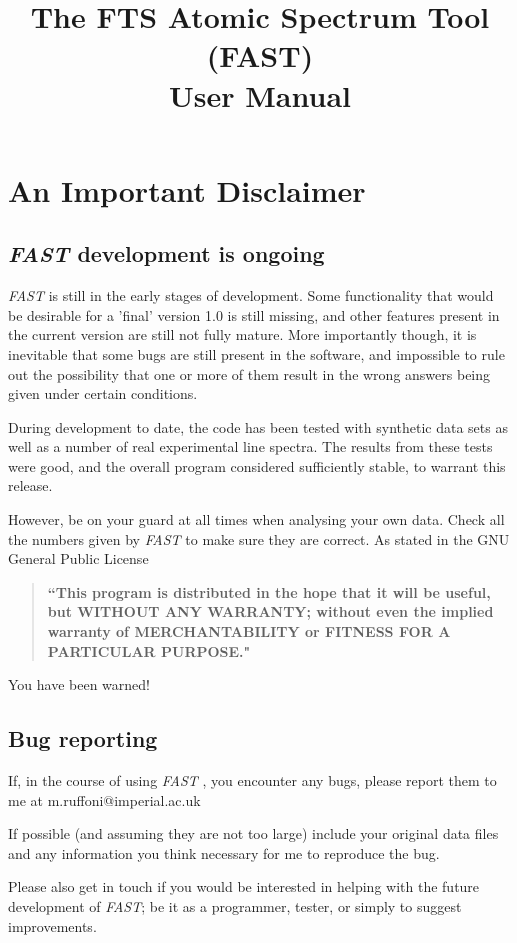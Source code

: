 \documentclass[a4paper,12pt]{report}
\title{The FTS Atomic Spectrum Tool (FAST) \\ User Manual}
\newcommand{\fast}{\emph{FAST} }
\begin{document}
\maketitle 
\tableofcontents
\chapter{An Important Disclaimer}
\section{\fast development is ongoing}
\fast is still in the early stages of development. Some functionality that would be desirable for a 'final' version 1.0 is still missing, and other features present in the current version are still not fully mature. More importantly though, it is inevitable that some bugs are still present in the software, and impossible to rule out the possibility that one or more of them result in the wrong answers being given under certain conditions.

During development to date, the code has been tested with synthetic data sets as well as a number of real experimental line spectra. The results from these tests were good, and the overall program considered sufficiently stable, to warrant this release.

However, be on your guard at all times when analysing your own data. Check all the numbers given by \fast to make sure they are correct. As stated in the GNU General Public License
\begin{quote}
{\bf``This program is distributed in the hope that it will be useful,
but WITHOUT ANY WARRANTY; without even the implied warranty of
MERCHANTABILITY or FITNESS FOR A PARTICULAR PURPOSE."}
\end{quote}
You have been warned!

\section{Bug reporting}
If, in the course of using \fast, you encounter any bugs, please report them to me at m.ruffoni@imperial.ac.uk

If possible (and assuming they are not too large) include your original data files and any information you think necessary for me to reproduce the bug.

Please also get in touch if you would be interested in helping with the future development of \emph{FAST}; be it as a programmer, tester, or simply to suggest improvements.
\end{document}
